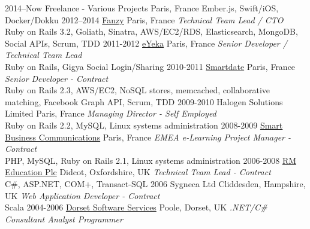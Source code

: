 \documentclass[]{friggeri-cv} %
\begin{document}
\begin{entrylist}
\entry
{2014--Now}
{Freelance - Various Projects}
{Paris, France}
{Ember.js, Swift/iOS, Docker/Dokku}
\entry
{2012--2014}
{\href{https://www.crunchbase.com/organization/fanrank}{Fanzy}}
{Paris, France}
{\emph{Technical Team Lead / CTO} \\
{\color{green}Ruby on Rails 3.2, Goliath, Sinatra, AWS/EC2/RDS, Elasticsearch, MongoDB, Social APIs, Scrum, TDD}}
\entry
{2011-2012}
{\href{https://en.eyeka.com/}{eYeka}}
{Paris, France}
{\emph{Senior Developer / Technical Team Lead} \\
Ruby on Rails, Gigya Social Login/Sharing}
\entry
{2010-2011}
{\href{https://www.crunchbase.com/organization/smartdate}{Smartdate}}
{Paris, France}
{\emph{Senior Developer - Contract} \\
Ruby on Rails 2.3, AWS/EC2, NoSQL stores, memcached, collaborative matching, Facebook Graph API, Scrum, TDD}
\entry
{2009-2010}
{Halogen Solutions Limited}
{Paris, France}
{\emph{Managing Director - Self Employed} \\
Ruby on Rails 2.2, MySQL, Linux systems administration}
\entry
{2008-2009}
{\href{http://www.smartbusinesscom.fr/}{Smart Business Communications}}
{Paris, France}
{\emph{EMEA e-Learning Project Manager - Contract} \\
PHP, MySQL, Ruby on Rails 2.1, Linux systems administration}
\entry
{2006-2008}
{\href{http://www.rm.com/}{RM Education Plc}}
{Didcot, Oxfordshire, UK}
{\emph{Technical Team Lead - Contract} \\
C\#, ASP.NET, COM+, Transact-SQL}
\entry
{2006}
{Sygneca Ltd}
{Cliddesden, Hampshire, UK}
{\emph{Web Application Developer - Contract} \\
Scala}
\entry
{2004-2006}
{\href{http://www.dorsetsoftware.com/}{Dorset Software Services}}
{Poole, Dorset, UK}
{\emph{.NET/C\# Consultant Analyst Programmer}}
\end{entrylist}

\end{document}
